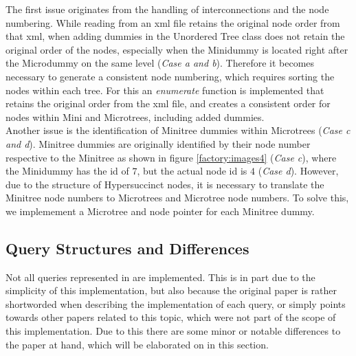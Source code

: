 \documentclass{article}
\begin{document}
The first issue originates from the handling of interconnections and the node numbering. While reading from an xml file retains the original node order from that xml, when adding dummies in the Unordered Tree class does not retain the original order of the nodes, especially when the Minidummy is located right after the Microdummy on the same level (\textit{Case a and b}). Therefore it becomes necessary to generate a consistent node numbering, which requires sorting the nodes within each tree. For this an \textit{enumerate} function is implemented that retains the original order from the xml file, and creates a consistent order for nodes within Mini and Microtrees, including added dummies.\\
Another issue is the identification of Minitree dummies within Microtrees (\textit{Case c and d}). Minitree dummies are originally identified by their node number respective to the Minitree as shown in figure \ref{factory:images4} (\textit{Case c}), where the Minidummy has the id of $7$, but the actual node id is $4$ (\textit{Case d}). However, due to the structure of Hypersuccinct nodes, it is necessary to translate the Minitree node numbers to Microtrees and Microtree node numbers. To solve this, we implemement a Microtree and node pointer for each Minitree dummy.

\subsection{Query Structures and Differences} \label{Query Structures and Differences}
Not all queries represented in \cite{farzanMunro} are implemented. This is in part due to the simplicity of this implementation, but also because the original paper is rather shortworded when describing the implementation of each query, or simply points towards other papers related to this topic, which were not part of the scope of this implementation.
Due to this there are some minor or notable differences to the paper at hand, which will be elaborated on in this section.
\end{document}
